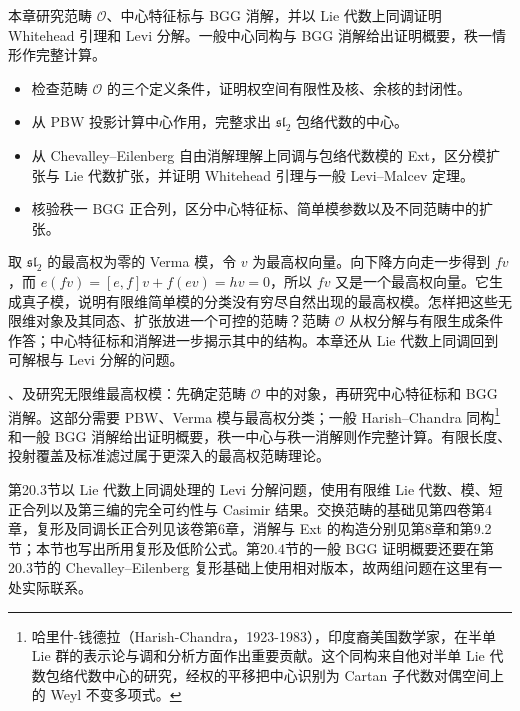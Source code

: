 

\begin{chapterabstract}
	本章研究范畴 \(\mathcal O\)、中心特征标与 BGG 消解，并以 Lie 代数上同调证明 Whitehead 引理和 Levi 分解。一般中心同构与 BGG 消解给出证明概要，秩一情形作完整计算。
\end{chapterabstract}

\begin{learninggoals}
	\begin{itemize}
		\item 检查范畴 \(\mathcal O\) 的三个定义条件，证明权空间有限性及核、余核的封闭性。
		\item 从 PBW 投影计算中心作用，完整求出 \(\mathfrak{sl}_2\) 包络代数的中心。
		\item 从 Chevalley--Eilenberg 自由消解理解上同调与包络代数模的 Ext，区分模扩张与 Lie 代数扩张，并证明 Whitehead 引理与一般 Levi--Malcev 定理。
		\item 核验秩一 BGG 正合列，区分中心特征标、简单模参数以及不同范畴中的扩张。
	\end{itemize}
\end{learninggoals}

取 \(\mathfrak{sl}_2\) 的最高权为零的 Verma 模，令 \(v\) 为最高权向量。向下降方向走一步得到 \(fv\)，而 \(e(fv)=[e,f]v+f(ev)=hv=0\)，所以 \(fv\) 又是一个最高权向量。它生成真子模，说明有限维简单模的分类没有穷尽自然出现的最高权模。怎样把这些无限维对象及其同态、扩张放进一个可控的范畴？范畴 \(\mathcal O\) 从权分解与有限生成条件作答；中心特征标和消解进一步揭示其中的结构。本章还从 Lie 代数上同调回到可解根与 Levi 分解的问题。

\ProseParagraphBreak
{}、及研究无限维最高权模：先确定范畴 \(\mathcal O\) 中的对象，再研究中心特征标和 BGG 消解。这部分需要 PBW、Verma 模与最高权分类；一般 Harish--Chandra 同构\footnote{哈里什-钱德拉（Harish-Chandra，1923-1983），印度裔美国数学家，在半单 Lie 群的表示论与调和分析方面作出重要贡献。这个同构来自他对半单 Lie 代数包络代数中心的研究，经权的平移把中心识别为 Cartan 子代数对偶空间上的 Weyl 不变多项式。}和一般 BGG 消解给出证明概要，秩一中心与秩一消解则作完整计算。有限长度、投射覆盖及标准滤过属于更深入的最高权范畴理论。

\ProseParagraphBreak
第20.3节以 Lie 代数上同调处理的 Levi 分解问题，使用有限维 Lie 代数、模、短正合列以及第三编的完全可约性与 Casimir 结果。交换范畴的基础见第四卷第4章，复形及同调长正合列见该卷第6章，消解与 Ext 的构造分别见第8章和第9.2节；本节也写出所用复形及低阶公式。第20.4节的一般 BGG 证明概要还要在第20.3节的 Chevalley--Eilenberg 复形基础上使用相对版本，故两组问题在这里有一处实际联系。

